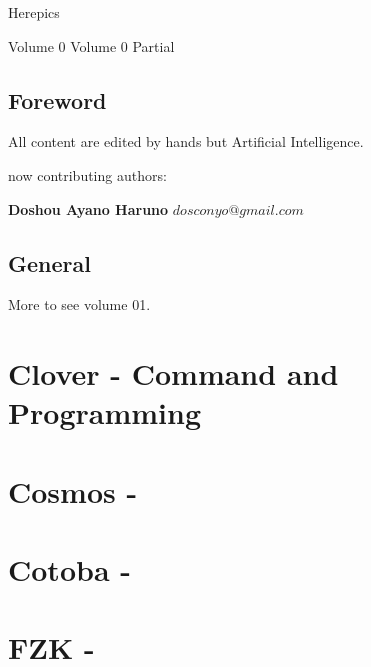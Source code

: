 
\author{dosconio}
\begin{center}
	\sc\fontsize{48pt}{0}\selectfont\textcolor[rgb]{1, 0, 0.618}{Herepics}
\end{center}
\ifdetail
{\hfill\sc\fontsize{24pt}{0}\selectfont\textcolor[rgb]{1, 0, 0.618}{Volume 0}}
\else
{\hfill\sc\fontsize{24pt}{0}\selectfont\textcolor[rgb]{1, 0, 0.618}{Volume 0} Partial}
\fi

\newpage %
\renewcommand{\contentsname}{Contents}
\tableofcontents

\section{Foreword} %

All content\cite{HEREPIC} are edited by hands but Artificial Intelligence.

now contributing authors:

\textbf{Doshou Ayano Haruno}
$dosconyo@gmail.com$

\section{General}


	

	More to see volume 01.%

	

\chapter{Clover \mbox{-} Command and Programming}


\chapter{Cosmos \mbox{-} }


\chapter{Cotoba \mbox{-} }


\chapter{FZK \mbox{-} }


